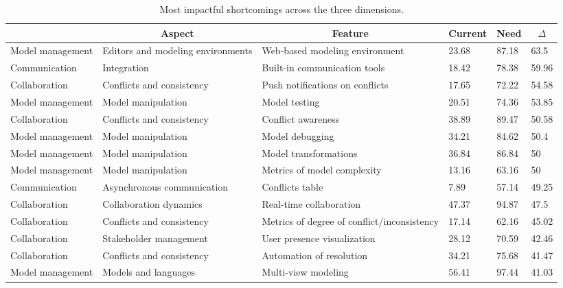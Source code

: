 
  \begin{table*}[]
  \centering
  \notsotiny
  \caption{ Most impactful shortcomings across the three dimensions.}
\label{tab:most-impactful}
\begin{tabular}{|l|l|l|l|l|l|}
  \hline
  \rowcolor[HTML]{C0C0C0}
    \multicolumn{1}{|c|}{Dimension} & \multicolumn{1}{c|}{Aspect} & \multicolumn{1}{c|}{Feature} & \multicolumn{1}{c|}{Current} & \multicolumn{1}{c|}{Need} & \multicolumn{1}{c|}{$\Delta$} \\ \hline
    Model management & Editors and modeling environments & Web-based modeling environment & 23.68 & 87.18 & 63.5 \\ \hline 
Communication & Integration & Built-in communication tools & 18.42 & 78.38 & 59.96 \\ \hline 
Collaboration & Conflicts and consistency & Push notifications on conflicts & 17.65 & 72.22 & 54.58 \\ \hline 
Model management & Model manipulation & Model testing & 20.51 & 74.36 & 53.85 \\ \hline 
Collaboration & Conflicts and consistency & Conflict awareness & 38.89 & 89.47 & 50.58 \\ \hline 
Model management & Model manipulation & Model debugging & 34.21 & 84.62 & 50.4 \\ \hline 
Model management & Model manipulation & Model transformations & 36.84 & 86.84 & 50 \\ \hline 
Model management & Model manipulation & Metrics of model complexity & 13.16 & 63.16 & 50 \\ \hline 
Communication & Asynchronous communication & Conflicts table & 7.89 & 57.14 & 49.25 \\ \hline 
Collaboration & Collaboration dynamics & Real-time collaboration & 47.37 & 94.87 & 47.5 \\ \hline 
Collaboration & Conflicts and consistency & Metrics of degree of conflict/inconsistency & 17.14 & 62.16 & 45.02 \\ \hline 
Collaboration & Stakeholder management & User presence visualization & 28.12 & 70.59 & 42.46 \\ \hline 
Collaboration & Conflicts and consistency & Automation of resolution & 34.21 & 75.68 & 41.47 \\ \hline 
Model management & Models and languages & Multi-view modeling & 56.41 & 97.44 & 41.03 \\ \hline 

\end{tabular}
\end{table*}

